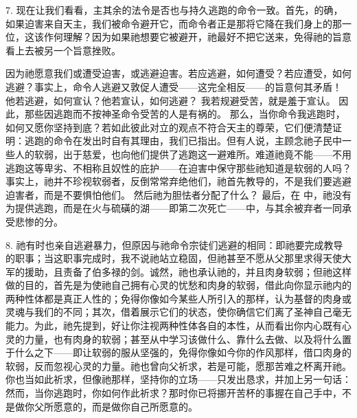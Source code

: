 7. 现在让我们看看，主其余的法令是否也与持久逃跑的命令一致。首先，的确，如果迫害来自天主，我们被命令避开它，而命令者正是那将它降在我们身上的那一位，这该作何理解？因为如果祂想要它被避开，祂最好不把它送来，免得祂的旨意看上去被另一个旨意挫败。\par

因为祂愿意我们或遭受迫害，或逃避迫害。若应逃避，如何遭受？若应遭受，如何逃避？事实上，命令人逃避又敦促人遭受——这完全相反——的旨意何其矛盾！ 他若逃避，如何宣认？他若宣认，如何逃避？ 我若规避受苦，就是羞于宣认。 因此，那些因逃跑而不按神圣命令受苦的人是有祸的。 那么，当你命令我逃跑时，如何又愿你坚持到底？若如此彼此对立的观点不符合天主的尊荣，它们便清楚证明：逃跑的命令在发出时自有其理由，我们已指出。但有人说，主顾念祂子民中一些人的软弱，出于慈爱，也向他们提供了逃跑这一避难所。难道祂竟不能——不用逃跑这等卑劣、不相称且奴性的庇护——在迫害中保守那些祂知道是软弱的人吗？事实上，祂并不珍视软弱者，反倒常常弃绝他们，祂首先教导的，不是我们要逃避迫害者，而是不要惧怕他们。 然后祂为胆怯者分配了什么？ 最后，在  中，祂没有为提供逃跑，而是在火与硫磺的湖——即第二次死亡——中，与其余被弃者一同承受悲惨的分。\par

8. 祂有时也亲自逃避暴力，但原因与祂命令宗徒们逃避的相同：即祂要完成教导的职事；当这职事完成时，我不说祂站立稳固，但祂甚至不愿从父那里求得天使大军的援助，且责备了伯多禄的剑。诚然，祂也承认祂的，并且肉身软弱；但祂这样做的目的，首先是为使祂自己拥有心灵的忧愁和肉身的软弱，借此向你显示祂内的两种性体都是真正人性的；免得你像如今某些人所引入的那样，认为基督的肉身或灵魂与我们的不同；其次，借着展示它们的状态，使你确信它们离了圣神自己毫无能力。为此，祂先提到，好让你注视两种性体各自的本性，从而看出你内心既有心灵的力量，也有肉身的软弱；甚至从中学习该做什么、靠什么去做、以及将什么置于什么之下——即让软弱的服从坚强的，免得你像如今你的作风那样，借口肉身的软弱，反而忽视心灵的力量。祂也曾向父祈求，若是可能，愿那苦难之杯离开祂。你也当如此祈求，但像祂那样，坚持你的立场——只发出恳求，并加上另一句话： 然而，当你逃跑时，你如何作此祈求？那时你已将挪开苦杯的事握在自己手中，不是做你父所愿意的，而是做你自己所愿意的。\par

